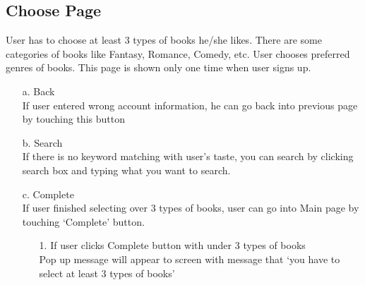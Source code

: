 \documentclass[conference]{IEEEtran}
\begin{document}
\subsection{Choose Page}

User has to choose at least 3 types of books he/she likes. There are some categories of books like Fantasy, Romance, Comedy, etc. User chooses preferred genres of books. This page is shown only one time when user signs up.
\begin{itemize}
    \item[a.] Back \\
    If user entered wrong account information, he can go back into previous page by touching this button
    \item[b.] Search \\
    If there is no keyword matching with user’s taste, you can search by clicking search box and typing what you want to search.
    \item[c.] Complete \\
    If user finished selecting over 3 types of books, user can go into Main page by touching ‘Complete’ button.
    \begin{itemize}
        \item[1.] If user clicks Complete button with under 3 types of books \\
        Pop up message will appear to screen with message that ‘you have to select at least 3 types of books’
    \end{itemize}
\end{itemize}
\end{document}
